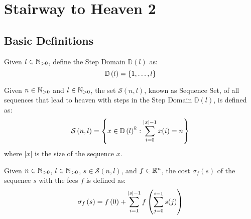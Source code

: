 \newcommand{\apply}[2]{\ensuremath{#1 \left( #2 \right)}}
\newcommand{\domain}{\ensuremath{\mathbb{D}}}
\newcommand{\domainf}[1]{\apply{\domain}{#1}}
\newcommand{\stepLimit}{\ensuremath{l}}
\newcommand{\fees}{\ensuremath{f}}
\newcommand{\fee}[1]{\apply{\fees}{#1}}
\newcommand{\nSteps}{\ensuremath{n}}
\newcommand{\oneN}{\ensuremath{\N_{>0}}}
\newcommand{\solution}{\ensuremath{s}}
\renewcommand{\length}[1]{\ensuremath{\left| #1 \right|}}
\newcommand{\allSequences}[2]{\ensuremath{\apply{\mathcal{S}}{#1, #2}}}
\newcommand{\cost}[2]{\ensuremath{\apply{\sigma_{#1}}{#2}}}

\chapter{Stairway to Heaven 2}

\section{Basic Definitions}

\begin{defn}
    Given $\stepLimit \in \oneN$, define the Step Domain $\domainf{\stepLimit}$ as:
    \begin{equation}
        \domainf{l} = \Set{1, \dots, \stepLimit}
    \end{equation}
\end{defn}

\begin{defn}
    Given $\nSteps \in \oneN$ and $\stepLimit \in \oneN$, the set $\allSequences{\nSteps}{\stepLimit}$, known as Sequence Set, of all sequences that lead to heaven with steps in the Step Domain $\domainf{\stepLimit}$, is defined as:
    \begin{equation}
        \allSequences{\nSteps}{\stepLimit}
        =
        \SetOf
            {x \in \domainf{\stepLimit}^k}
            {\Sum{i = 0}{\length{x}-1}{x(i)} = \nSteps}
    \end{equation}
    where $\length{x}$ is the size of the sequence $x$.
\end{defn}

\begin{defn}
    Given $\nSteps \in \oneN$, $\stepLimit \in \oneN$, $\solution \in \allSequences{\nSteps}{\stepLimit}$, and $\fees \in \R^n$, the cost $\cost{\fees}{\solution}$ of the sequence $\solution$ with the fees $\fees$ is defined as:
    \begin{equation}
        \cost{\fees}{\solution} =
        \fee{0}
        +
        \Sum{i = 1}{\length{\solution} - 1}{\fee{\Sum{j=0}{i-1}{\solution(j)}}}
    \end{equation}
\end{defn}

